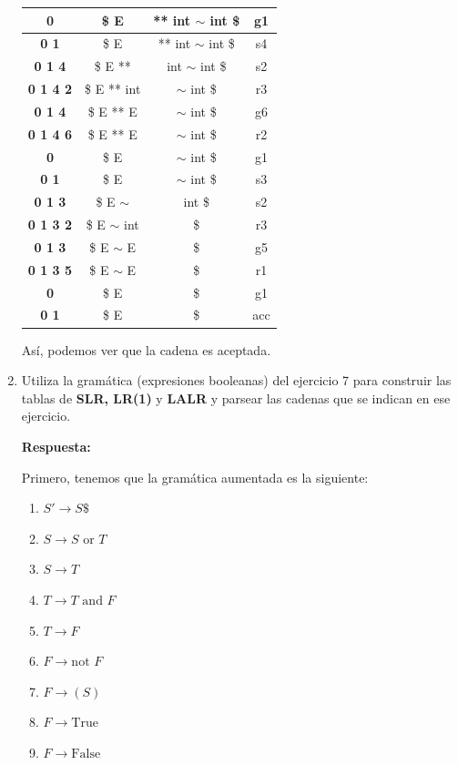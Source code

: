 \documentclass[12pt, letterpaper]{article}
\begin{document}
\begin{enumerate}
\begin{table}[H]
\begin{tabular}{|c|c|c|c|}
    \textbf{0}       & \$ E              & ** int $\sim$ int \$     & g1              \\ \hline
    \textbf{0 1}     & \$ E              & ** int $\sim$ int \$     & s4              \\ \hline
    \textbf{0 1 4}   & \$ E **           & int $\sim$ int \$        & s2              \\ \hline
    \textbf{0 1 4 2} & \$ E ** int       & $\sim$ int \$            & r3              \\ \hline
    \textbf{0 1 4}   & \$ E ** E         & $\sim$ int \$            & g6              \\ \hline
    \textbf{0 1 4 6} & \$ E ** E         & $\sim$ int \$            & r2              \\ \hline
    \textbf{0}       & \$ E              & $\sim$ int \$            & g1              \\ \hline
    \textbf{0 1}     & \$ E              & $\sim$ int \$            & s3              \\ \hline
    \textbf{0 1 3}   & \$ E $\sim$       & int \$                   & s2              \\ \hline
    \textbf{0 1 3 2} & \$ E $\sim$ int   & \$                       & r3              \\ \hline
    \textbf{0 1 3}   & \$ E $\sim$ E     & \$                       & g5              \\ \hline
    \textbf{0 1 3 5} & \$ E $\sim$ E     & \$                       & r1              \\ \hline
    \textbf{0}       & \$ E              & \$                       & g1              \\ \hline
    \textbf{0 1}     & \$ E              & \$                       & acc             \\ \hline
  \end{tabular}
\end{table}
Así, podemos ver que la cadena es aceptada.
\item Utiliza la gramática (expresiones booleanas) del ejercicio 7 para construir las tablas de \textbf{SLR, LR(1)} y \textbf{LALR} y parsear las cadenas que se indican en ese ejercicio.
    
    \textbf{Respuesta:}



Primero, tenemos que la gramática aumentada es la siguiente:
\begin{enumerate}[label=(\arabic*), start=0]
    \item $S' \to S\$$
    \item $S \to S \text{ or } T$
    \item $S \to T$
    \item $T \to T \text{ and } F$
    \item $T \to F$
    \item $F \to \text{not } F$
    \item $F \to ( S )$
    \item $F \to \text{True}$
    \item $F \to \text{False}$
\end{enumerate}


\end{enumerate}
\end{document}
